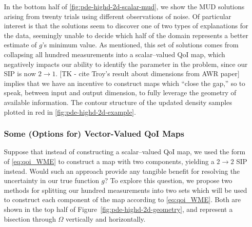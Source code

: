 In the bottom half of \ref{fig:pde-highd-2d-scalar-mud}, we show the MUD solutions arising from twenty trials using different observations of noise.
Of particular interest is that the solutions seem to discover one of two types of explanations for the data, seemingly unable to decide which half of the domain represents a better estimate of $g$'s minimum value.
As mentioned, this set of solutions comes from collapsing all hundred measurements into a scalar--valued QoI map, which negatively impacts our ability to identify the parameter in the problem, since our SIP is now $2\rightarrow 1$.
[TK - cite Troy's result about dimensions from AWR paper] implies that we have an incentive to construct maps which ``close the gap,'' so to speak, between input and output dimension, to fully leverage the geometry of available information.
The contour structure of the updated density samples plotted in red in \ref{fig:pde-highd-2d-example}.


\FloatBarrier
\subsubsection{Some (Options for) Vector-Valued QoI Maps}

Suppose that instead of constructing a scalar--valued QoI map, we used the form of \eqref{eq:qoi_WME} to construct a map with two components, yielding a $2 \rightarrow 2$ SIP instead.
Would such an approach provide any tangible benefit for resolving the uncertainty in our true function $g$?
To explore this question, we propose two methods for splitting our hundred measurements into two sets which will be used to construct each component of the map according to \eqref{eq:qoi_WME}.
Both are shown in the top half of Figure~\ref{fig:pde-highd-2d-geometry}, and represent a bisection through $\Omega$ vertically and horizontally.

